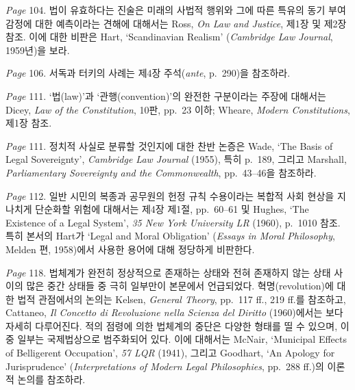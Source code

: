 {\emph{Page} 104.  법이
유효하다는 진술은 미래의 사법적 행위와 그에 따른 특유의 동기 부여 감정에
대한 예측이라는 견해에 대해서는 Ross, \emph{On Law and Justice}, 제1장
및 제2장 참조. 이에 대한 비판은 Hart, `Scandinavian Realism'
(\emph{Cambridge Law Journal}, 1959년)을 보라.

\emph{Page} 106.  서독과 터키의 사례는 제4장 주석(\emph{ante},
p.~290)을 참조하라.

\emph{Page} 111.  `법(law)'과 `관행(convention)'의 완전한
구분이라는 주장에 대해서는 Dicey, \emph{Law of the Constitution}, 10판,
pp.~23 이하; Wheare, \emph{Modern Constitutions}, 제1장 참조.

\emph{Page} 111. 
정치적 사실로 분류할 것인지에 대한 찬반 논증은 Wade, `The Basis of Legal
Sovereignty', \emph{Cambridge Law Journal} (1955), 특히 p.~189, 그리고
Marshall, \emph{Parliamentary Sovereignty and the Commonwealth},
pp.~43--46을 참조하라.

\emph{Page} 112.  일반 시민의 복종과 공무원의 헌정 규칙
수용이라는 복합적 사회 현상을 지나치게 단순화할 위험에 대해서는 제4장
제1절, pp.~60--61 및 Hughes, `The Existence of a Legal System', \emph{35
New York University LR} (1960), p.~1010 참조. 특히 본서의 Hart가 `Legal
and Moral Obligation' (\emph{Essays in Moral Philosophy}, Melden 편,
1958)에서 사용한 용어에 대해 정당하게 비판한다.

\emph{Page} 118.  법체계가 완전히 정상적으로 존재하는 상태와 전혀 존재하지 않는
상태 사이의 많은 중간 상태들 중 극히 일부만이 본문에서 언급되었다.
혁명(revolution)에 대한 법적 관점에서의 논의는 Kelsen, \emph{General
Theory}, pp.~117 ff., 219 ff.를 참조하고, Cattaneo, \emph{Il Concetto di
Revoluzione nella Scienza del Diritto} (1960)에서는 보다 자세히
다루어진다. 적의 점령에 의한 법체계의 중단은 다양한 형태를 띨 수 있으며,
이 중 일부는 국제법상으로 범주화되어 있다. 이에 대해서는 McNair,
`Municipal Effects of Belligerent Occupation', \emph{57 LQR} (1941),
그리고 Goodhart, `An Apology for Jurisprudence' (\emph{Interpretations
of Modern Legal Philosophies}, pp.~288 ff.)의 이론적 논의를 참조하라.

}
